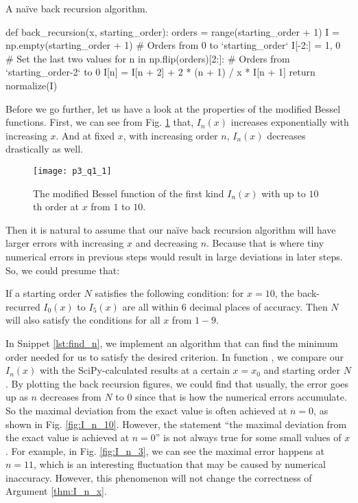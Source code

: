 \begin{algorithm}
    \caption{A naïve back recursion algorithm.}
    \label{lst:back_recursion}
    \begin{pythoncode}
        def back_recursion(x, starting_order):
            orders = range(starting_order + 1)
            I = np.empty(starting_order + 1)  # Orders from 0 to `starting_order`
            I[-2:] = 1, 0  # Set the last two values
            for n in np.flip(orders)[2:]:  # Orders from `starting_order-2` to 0
                I[n] = I[n + 2] + 2 * (n + 1) / x * I[n + 1]
            return normalize(I)
    \end{pythoncode}
\end{algorithm}

Before we go further, let us have a look at the properties of the modified Bessel
functions. First, we can see from Fig. \ref{fig:bessel} that,
$I_n(x)$ increases exponentially with increasing $x$.
And at fixed $x$, with increasing order $n$, $I_n(x)$ decreases drastically as well.

\begin{figure}[H]
    \centering
    \texttt{[image: p3\_q1\_1]}
    \caption{The modified Bessel function of the first kind $I_n(x)$ with
        up to $10$th order at $x$ from $1$ to $10$.}
    \label{fig:bessel}
\end{figure}

Then it is natural to assume that our naïve back recursion algorithm will have larger
errors with increasing $x$ and decreasing $n$. Because that is where tiny numerical
errors in previous steps would result in large deviations in later steps.
So, we could presume that:
\begin{theorem}\label{thm:I_n_x}
    If a starting order $N$ satisfies the following condition:
    for $x = 10$, the back-recurred $I_0(x)$ to $I_5(x)$ are all within $6$ decimal
    places of accuracy. Then $N$ will also satisfy the conditions for all $x$ from $1 - 9$.
\end{theorem}

In Snippet \ref{lst:find_n}, we implement an algorithm that can find the minimum order
needed for us to satisfy the desired criterion. In function , we compare
our $I_n(x)$ with the SciPy-calculated results at a certain $x = x_0$ and starting order $N$.
By plotting the back recursion figures, we could find that usually, the error goes up
as $n$ decreases from $N$ to $0$ since that is how the numerical errors accumulate.
So the maximal deviation from the exact value is often achieved at $n = 0$, as shown in
Fig. \ref{fig:I_n_10}. However, the statement ``the maximal deviation from the exact value
is achieved at $n = 0$'' is not always true for some small values of $x$. For example,
in Fig. \ref{fig:I_n_3}, we can see the maximal error happens at $n = 11$, which is an
interesting fluctuation that may be caused by numerical inaccuracy. However, this phenomenon
will not change the correctness of Argument \ref{thm:I_n_x}.

